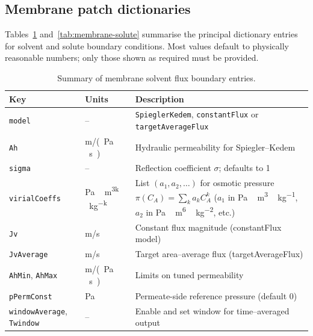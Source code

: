 \documentclass[11pt,a4paper]{article}
\begin{document}
\subsection{Membrane patch dictionaries}


Tables~\ref{tab:membrane-solvent} and~\ref{tab:membrane-solute}
summarise the principal dictionary entries for solvent and solute
boundary conditions.  Most values default to physically reasonable
numbers; only those shown as required must be provided.

\begin{table}[h]
  \centering
  \caption{Summary of membrane solvent flux boundary entries.}
  \label{tab:membrane-solvent}
  \begin{tabular}{@{}llp{8cm}@{}}
    \toprule
    Key & Units & Description\\
    \midrule
    \texttt{model} & – & \texttt{SpieglerKedem}, \texttt{constantFlux} or \texttt{targetAverageFlux}\\
    \texttt{Ah} & \si{m/(Pa\,s)} & Hydraulic permeability for Spiegler–Kedem\\
    \texttt{sigma} & – & Reflection coefficient \(\sigma\); defaults to 1\\
    \texttt{virialCoeffs} & \si{Pa\,m^{3k}\,kg^{-k}} & List \((a_1,a_2,\dots)\) for osmotic pressure $\pi(C_A)=\sum_k a_k C_A^k$ ($a_1$ in \si{Pa\,m^3\,kg^{-1}}, $a_2$ in \si{Pa\,m^6\,kg^{-2}}, etc.)\\
    \texttt{Jv} & \si{m/s} & Constant flux magnitude (constantFlux model)\\
    \texttt{JvAverage} & \si{m/s} & Target area–average flux (targetAverageFlux)\\
    \texttt{AhMin}, \texttt{AhMax} & \si{m/(Pa\,s)} & Limits on tuned permeability\\
    \texttt{pPermConst} & \si{Pa} & Permeate-side reference pressure (default 0)\\
    \texttt{windowAverage}, \texttt{Twindow} & – & Enable and set window for time–averaged output\\
    \bottomrule
  \end{tabular}
\end{table}
\end{document}
